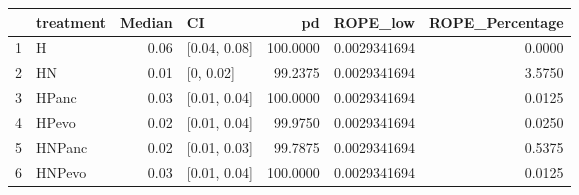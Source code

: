 \begin{table}[ht]
\centering
\begin{tabular}{llrlrrr}
  \hline
 & treatment & Median & CI & pd & ROPE\_low & ROPE\_Percentage \\ 
  \hline
1 & H & 0.06 & [0.04, 0.08] & 100.0000 & 0.0029341694 & 0.0000 \\ 
  2 & HN & 0.01 & [0, 0.02] & 99.2375 & 0.0029341694 & 3.5750 \\ 
  3 & HPanc & 0.03 & [0.01, 0.04] & 100.0000 & 0.0029341694 & 0.0125 \\ 
  4 & HPevo & 0.02 & [0.01, 0.04] & 99.9750 & 0.0029341694 & 0.0250 \\ 
  5 & HNPanc & 0.02 & [0.01, 0.03] & 99.7875 & 0.0029341694 & 0.5375 \\ 
  6 & HNPevo & 0.03 & [0.01, 0.04] & 100.0000 & 0.0029341694 & 0.0125 \\ 
   \hline
\end{tabular}
\end{table}

